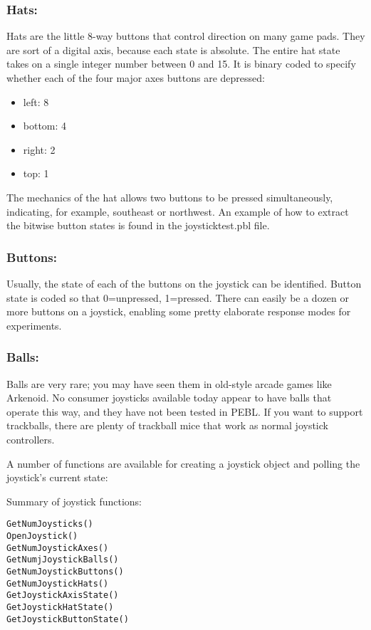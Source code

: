 \subsubsection{Hats:}
  Hats are the little 8-way buttons that control direction on many game pads.  They are sort of a digital axis, because each state is absolute.  The entire hat state takes on a single integer number between 0 and 15.  It is binary coded to specify whether each of the four major axes buttons are depressed:
\begin{itemize}
\item left: 8
\item bottom: 4
\item right: 2
\item top: 1
\end{itemize}
The mechanics of the hat allows two buttons to be pressed simultaneously, indicating, for example, southeast or northwest.  An example of how to extract the bitwise button states is found in the joysticktest.pbl file.

\subsubsection{Buttons:}
  Usually, the state of each of the buttons on the joystick can be identified.  Button state is coded so that 0=unpressed, 1=pressed.  There  can easily be a dozen or more buttons on a joystick, enabling some pretty elaborate response modes for experiments.

\subsubsection{Balls:} 
Balls are very rare; you may have seen them in old-style arcade games like Arkenoid.   No consumer joysticks available today appear to have balls that operate this way, and they have not been tested in PEBL.  If you want to support trackballs, there are plenty of trackball mice that work as normal joystick controllers.

A number of functions are available for creating a joystick object and polling the joystick's current state:


Summary of joystick functions:
\begin{verbatim}
GetNumJoysticks()
OpenJoystick()
GetNumJoystickAxes()
GetNumjJoystickBalls()
GetNumJoystickButtons()
GetNumJoystickHats()
GetJoystickAxisState()
GetJoystickHatState()
GetJoystickButtonState()
\end{verbatim}

